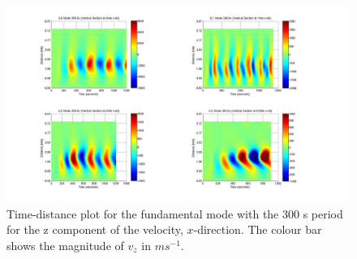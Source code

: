 \documentclass[preprint,authoryear,12pt]{elsarticle}
\begin{document}

\begin{figure}[h]
\includegraphics[scale=0.8]{imrescale/dt_300_vert_x.jpg}
\caption{Time-distance plot for the fundamental mode with the 300 s period for the z component of the velocity, $x$-direction. The colour bar shows the magnitude of $v_z$ in $ms^{-1}$. }
\label{Fig7}
\end{figure}






\end{document}
